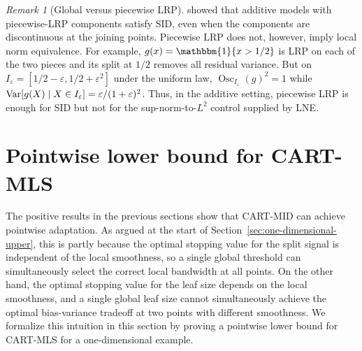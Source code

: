 \documentclass[11pt]{article}
\theoremstyle{plain}
\theoremstyle{definition}
\theoremstyle{remark}
\newtheorem{remark}[theorem]{Remark}
\theoremstyle{plain}
\newcommand{\Var}{\textnormal{Var}}
\newcommand{\1}{\mathbbm{1}}
\begin{document}
\begin{remark}[Global versus piecewise LRP]
    \citet[Proposition~3.2]{Mazumder2024} showed that additive
    models with piecewise-LRP components satisfy SID, even when
    the components are discontinuous at the joining points.
    Piecewise LRP does not, however, imply local norm
    equivalence.  For example,
    $g(x)=\1\{x>1/2\}$ is LRP on each of the two pieces and its
    split at $1/2$ removes all residual variance.  But on
    $I_\varepsilon=[1/2-\varepsilon,1/2+\varepsilon^2]$ under
    the uniform law,
    $\operatorname{Osc}_{I_\varepsilon}(g)^2=1$ while
    $\Var[g(X)\mid X\in I_\varepsilon]=\varepsilon/(1+\varepsilon)^2$.
    Thus, in the additive setting, piecewise LRP is enough for
    SID but not for the sup-norm-to-$L^2$ control supplied by
    LNE.
\end{remark}






\section{Pointwise lower bound for CART-MLS}
\label{sec::motivation-lower-bound}

The positive results in the previous sections show that CART-MID can achieve pointwise adaptation.
As argued at the start of Section~\ref{sec:one-dimensional-upper}, this is partly because the optimal stopping value for the split signal is independent of the local smoothness, so a single global threshold can simultaneously select the correct local bandwidth at all points.
On the other hand, the optimal stopping value for the leaf size depends on the local smoothness, and a single global leaf size cannot simultaneously achieve the optimal bias-variance tradeoff at two points with different smoothness.
We formalize this intuition in this section by proving a pointwise lower bound for CART-MLS for a one-dimensional example.
\end{document}
